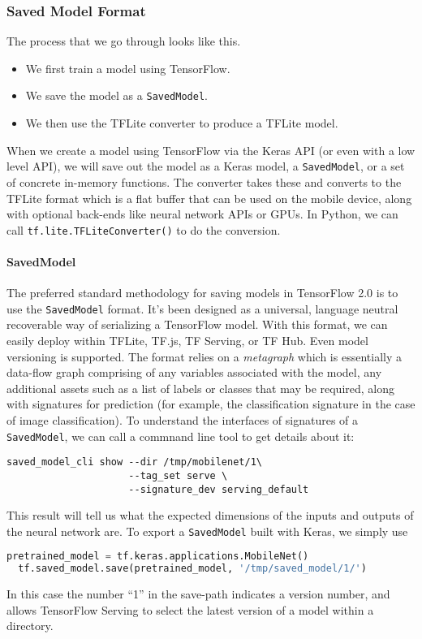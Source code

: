 \documentclass[12pt]{article}
\begin{document}
\subsubsection{Saved Model Format} The process that we go through looks like this.
\begin{itemize}
\item We first train a model using TensorFlow.
\item We save the model as a \texttt{SavedModel}.
\item We then use the TFLite converter to produce a TFLite model.
\end{itemize}

When we create a model using TensorFlow via the Keras API (or even with a low level API), we will save out the model as a Keras model, a \texttt{SavedModel}, or a set of concrete in-memory functions. The converter takes these and converts to the TFLite format which is a flat buffer that can be used on the mobile device, along with optional back-ends like neural network APIs or GPUs. In Python, we can call \texttt{tf.lite.TFLiteConverter()} to do the conversion.

\paragraph{SavedModel} The preferred standard methodology for saving models in TensorFlow 2.0 is to use the \texttt{SavedModel} format. It's been designed as a universal, language neutral recoverable way of serializing a TensorFlow model. With this format, we can easily deploy within TFLite, TF.js, TF Serving, or TF Hub. Even model versioning is supported. The format relies on a \emph{metagraph} which is essentially a data-flow graph comprising of any variables associated with the model, any additional assets such as a list of labels or classes that may be required, along with signatures for prediction (for example, the classification signature in the case of image classification). To understand the interfaces of signatures of a \texttt{SavedModel}, we can call a commnand line tool to get details about it:
\begin{verbatim}
saved_model_cli show --dir /tmp/mobilenet/1\
                     --tag_set serve \
                     --signature_dev serving_default
\end{verbatim}
This result will tell us what the expected dimensions of the inputs and outputs of the neural network are. To export a \texttt{SavedModel} built with Keras, we simply use
\begin{lstlisting}[language=Python]
  pretrained_model = tf.keras.applications.MobileNet()
  tf.saved_model.save(pretrained_model, '/tmp/saved_model/1/')
\end{lstlisting}
In this case the number ``1'' in the save-path indicates a version number, and allows TensorFlow Serving to select the latest version of a model within a directory.
\end{document}
